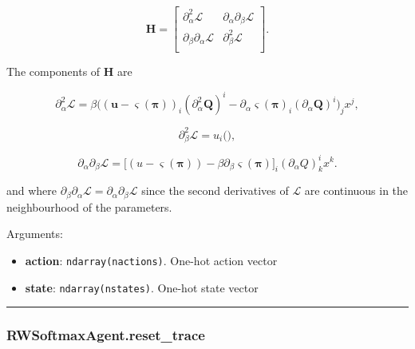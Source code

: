 \[
\mathbf H = \left[
\begin{array}{cc}
\partial^2_{\alpha} \mathcal L & \partial_{\alpha} \partial_{\beta} \mathcal L \\
\partial_{\beta} \partial_{\alpha} \mathcal L & \partial^2_{\beta} \mathcal L \\
\end{array}\right].
\]

The components of \(\mathbf H\) are

\[
\partial^2_{\alpha} \mathcal L = \beta \Big( (\mathbf u - \varsigma(\boldsymbol\pi))_i (\partial^2_\alpha \mathbf Q)^i - \partial_{\alpha} \varsigma(\boldsymbol\pi)_i (\partial_{\alpha} \mathbf Q)^i \Big)_j x^j,
\]

\[
\partial^2_{\beta} \mathcal L = u_i \Big( \Big),
\]

\[
\partial_{\alpha} \partial_{\beta} \mathcal L = \Bigg[ (u - \varsigma(\boldsymbol\pi)) - \beta \partial_{\beta} \varsigma(\boldsymbol\pi) \Bigg]_i (\partial_{\alpha} Q)^i_k x^k.
\]

and where
\(\partial_{\beta} \partial_{\alpha} \mathcal L = \partial_{\alpha} \partial_{\beta} \mathcal L\)
since the second derivatives of \(\mathcal L\) are continuous in the
neighbourhood of the parameters.

Arguments:

\begin{itemize}
\tightlist
\item
  \textbf{action}: \texttt{ndarray(nactions)}. One-hot action vector
\item
  \textbf{state}: \texttt{ndarray(nstates)}. One-hot state vector
\end{itemize}

\begin{center}\rule{0.5\linewidth}{\linethickness}\end{center}

\subsubsection{RWSoftmaxAgent.reset\_trace}\label{rwsoftmaxagent.reset_trace}

\begin{Shaded}
\begin{Highlighting}[]
\OperatorTok{=}\NormalTok{)}
\end{Highlighting}
\end{Shaded}

